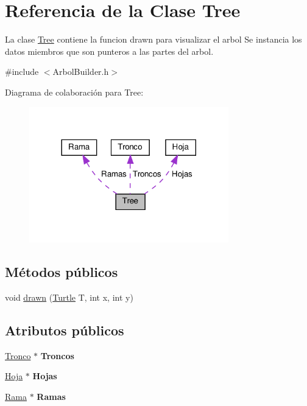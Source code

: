 \hypertarget{classTree}{}\section{Referencia de la Clase Tree}
\label{classTree}


La clase \hyperlink{classTree}{Tree} contiene la funcion drawn para visualizar el arbol  Se instancia los datos miembros que son punteros a las partes del arbol.  




{\ttfamily \#include $<$Arbol\+Builder.\+h$>$}



Diagrama de colaboración para Tree\+:
\nopagebreak
\begin{figure}[H]
\begin{center}
\leavevmode
\includegraphics[width=245pt]{classTree__coll__graph}
\end{center}
\end{figure}
\subsection*{Métodos públicos}
\begin{DoxyCompactItemize}
\item 
void \hyperlink{classTree_aeb680a32bf1743d52cf63da53712dc7d}{drawn} (\hyperlink{classTurtle}{Turtle} T, int x, int y)
\end{DoxyCompactItemize}
\subsection*{Atributos públicos}
\begin{DoxyCompactItemize}
\item 
\mbox{\label{classTree_a96e70d44324ad226b6a7fc1576ee7554}} 
\hyperlink{classTronco}{Tronco} $\ast$ {\bfseries Troncos}
\item 
\mbox{\label{classTree_a8651c39bf1509dca86eb9fdd872581e0}} 
\hyperlink{classHoja}{Hoja} $\ast$ {\bfseries Hojas}
\item 
\mbox{\label{classTree_a61e6de64e4f19bcf92f3c1cff9f17441}} 
\hyperlink{classRama}{Rama} $\ast$ {\bfseries Ramas}
\end{DoxyCompactItemize}


